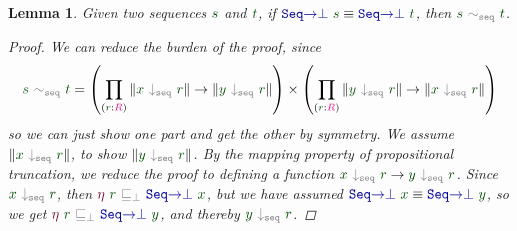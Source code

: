 \documentclass[twoside,11pt,openright]{report}
\theoremstyle{plain} %
\newtheorem{lem}[thm]{Lemma}
\theoremstyle{definition}
\theoremstyle{remark}
\newcommand*{\term}[1]{\textcolor{green!30!black}{#1}} %
\newcommand*{\type}[1]{\textcolor{magenta!90!black}{#1}}
\newcommand*{\relation}[1]{\textcolor{gray}{\ensuremath{\mathtt{#1}}}}
\newcommand*{\function}[1]{\textcolor{blue!60!black}{\ensuremath{\mathtt{#1}}}}
\newcommand*{\constructor}[1]{\textcolor{purple!60!black}{\ensuremath{\mathtt{#1}}}}
\begin{document}
\begin{lem}
  \label{eq:injectivity-lemma}
  Given two sequences \(\term{s}\) and \(\term{t}\), if \(\function{Seq{\rightarrow}\bot}~\term{s} \equiv \function{Seq{\rightarrow}\bot}~\term{t}\), then \(\term{s}~\relation{\sim_{seq}}~\term{t}\).
  \begin{proof}
    We can reduce the burden of the proof, since
    \begin{equation}
      \term{s}~\relation{\sim_{seq}}~\term{t} = \left(\prod_{(\term{r} : \type{R})} \| \term{x}~\relation{\downarrow_{seq}}~\term{r} \| \rightarrow \| \term{y}~\relation{\downarrow_{seq}}~\term{r} \|\right) \times \left(\prod_{(\term{r} : \type{R})} \| \term{y}~\relation{\downarrow_{seq}}~\term{r} \| \rightarrow \| \term{x}~\relation{\downarrow_{seq}}~\term{r} \|\right)
    \end{equation}
    so we can just show one part and get the other by symmetry. We assume \(\| \term{x}~\relation{\downarrow_{seq}}~\term{r} \|\), to show \(\| \term{y}~\relation{\downarrow_{seq}}~\term{r} \|\). By the mapping property of propositional truncation, we reduce the proof to defining a function \(\term{x}~\relation{\downarrow_{seq}}~\term{r} \rightarrow \term{y}~\relation{\downarrow_{seq}}~\term{r}\). Since \(\term{x}~\relation{\downarrow_{seq}}~\term{r}\), then \(\constructor{\eta}~\term{r}~\relation{\sqsubseteq_{\bot}}~\function{Seq{\rightarrow}\bot}~\term{x}\), but we have assumed \(\function{Seq{\rightarrow}\bot}~\term{x} \equiv \function{Seq{\rightarrow}\bot}~\term{y}\), so we get \(\constructor{\eta}~\term{r}~\relation{\sqsubseteq_{\bot}}~\function{Seq{\rightarrow}\bot}~\term{y}\), and thereby \(\term{y}~\relation{\downarrow_{seq}}~\term{r}\).
  \end{proof}
\end{lem}
\end{document}
